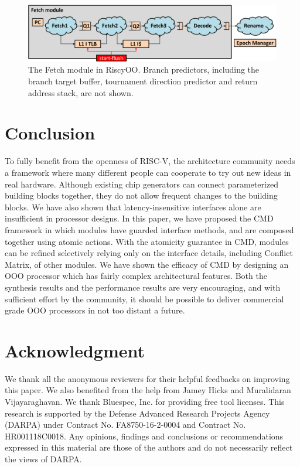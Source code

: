 \documentclass[conference]{IEEEtran}
\begin{document}
\begin{figure}[!htb]
    \centering
    \includegraphics[width=\columnwidth]{figs/fetch_cropped.pdf}
    \caption{The Fetch module in RiscyOO. Branch predictors, including the branch target buffer, tournament direction predictor and return address stack, are not shown.}\label{fig:fetch}
\end{figure}

\section{Conclusion}\label{sec:conclude}
To fully benefit from the openness of RISC-V, the architecture community needs a framework where many different people can cooperate to try out new ideas in real hardware.
Although existing chip generators can connect parameterized building blocks together,  they do not allow frequent changes to the building blocks.
We have also shown that latency-insensitive interfaces alone are insufficient in processor designs.
In this paper, we have proposed the CMD framework in which modules have guarded interface methods, and are composed together using atomic actions. 
With the atomicity guarantee in CMD, modules can be refined selectively relying only on the interface details, including Conflict Matrix, of other modules.
We have shown the efficacy of CMD by designing an OOO processor which has fairly complex architectural features.
Both the synthesis results and the performance results are very encouraging, and with sufficient effort by the community, it should be possible to deliver commercial grade OOO processors in not too distant a future.

\section*{Acknowledgment}
We thank all the anonymous reviewers for their helpful feedbacks on improving this paper.
We also benefited from the help from Jamey Hicks and Muralidaran Vijayaraghavan.
We thank Bluespec, Inc. for providing free tool licenses.
This research is supported by the Defense Advanced Research Projects Agency (DARPA) under Contract No. FA8750-16-2-0004 and Contract No. HR001118C0018.
Any opinions, findings and conclusions or recommendations expressed in this material are those of the authors and do not necessarily reflect the views of DARPA.



\end{document}
